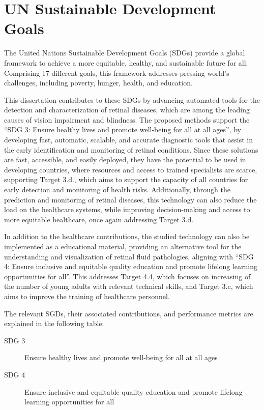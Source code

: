 \chapter*{UN Sustainable Development Goals} \label{chap:UnitedNations}

The United Nations Sustainable Development Goals (SDGs) provide a global framework to achieve a more equitable, healthy, and sustainable future for all. Comprising 17 different goals, this framework addresses pressing world's challenges, including poverty, hunger, health, and education.
\par
This dissertation contributes to these SDGs by advancing automated tools for the detection and characterization of retinal diseases, which are among the leading causes of vision impairment and blindness. The proposed methods support the ``SDG 3: Ensure healthy lives and promote well-being for all at all ages'', by developing fast, automatic, scalable, and accurate diagnostic tools that assist in the early identification and monitoring of retinal conditions. Since these solutions are fast, accessible, and easily deployed, they have the potential to be used in developing countries, where resources and access to trained specialists are scarce, supporting Target 3.d., which aims to support the capacity of all countries for early detection and monitoring of health risks. Additionally, through the prediction and monitoring of retinal diseases, this technology can also reduce the load on the healthcare systems, while improving decision-making and access to more equitable healthcare, once again addressing Target 3.d.
\par
In addition to the healthcare contributions, the studied technology can also be implemented as a educational material, providing an alternative tool for the understanding and visualization of retinal fluid pathologies, aligning with ``SDG 4: Ensure inclusive and equitable quality education and promote lifelong learning opportunities for all''. This addresses Target 4.4, which focuses on increasing of the number of young adults with relevant technical skills, and Target 3.c, which aims to improve the training of healthcare personnel.
\par
The relevant SGDs, their associated contributions, and performance metrics are explained in the following table:

\begin{description}
\item [SDG 3]
Ensure healthy lives and promote well-being for all at all ages
\item [SDG 4]
Ensure inclusive and equitable quality education and promote lifelong learning opportunities for all
\end{description}

